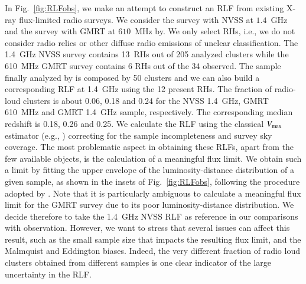 \documentclass[useAMS,usenatbib]{mn2e}
\begin{document}
\begin{appendix}
In Fig.~\ref{fig:RLFobs}, we make an attempt to construct an RLF from existing
X-ray flux-limited radio surveys. We consider the
\cite{1999NewA....4..141G} survey with NVSS at $1.4$~GHz and the
\cite{VenturiGMRT_1,VenturiGMRT_2} survey with GMRT at $610$~MHz by. We only
select RHs, i.e., we do not consider radio relics or other diffuse radio
emissions of unclear classification. The 1.4~GHz NVSS survey contains 13~RHs out
of 205 analyzed clusters while the 610~MHz GMRT survey contains 6 RHs out of the
34 observed. The sample finally analyzed by \cite{VenturiGMRT_1,VenturiGMRT_2}
is composed by 50 clusters and we can also build a corresponding RLF at 1.4~GHz
using the 12 present RHs. The fraction of radio-loud clusters is about 0.06, 0.18
and 0.24 for the NVSS 1.4~GHz, GMRT 610~MHz and GMRT 1.4~GHz sample,
respectively. The corresponding median redshift is 0.18, 0.26 and 0.25. We
calculate the RLF using the classical $V_{{\mathrm{max}}}$ estimator (e.g.,
\citealp{1976ApJ...207..700F}) correcting for the sample incompleteness and
survey sky coverage. The most problematic aspect in obtaining these RLFs, apart
from the few available objects, is the calculation of a meaningful flux
limit. We obtain such a limit by fitting the upper envelope of the
luminosity-distance distribution of a given sample, as shown in the insets of
Fig.~\ref{fig:RLFobs}, following the procedure adopted by
\cite{2011arXiv1106.5494B}. Note that it is particularly ambiguous to calculate
a meaningful flux limit for the GMRT survey due to its poor luminosity-distance
distribution. We decide therefore to take the 1.4~GHz NVSS RLF as reference in
our comparisons with observation. However, we want to stress that several issues
can affect this result, such as the small sample size that impacts the resulting
flux limit, and the Malmquist and Eddington biases. Indeed, the very different
fraction of radio loud clusters obtained from different samples is one clear
indicator of the large uncertainty in the RLF. 


\end{appendix}
\end{document}
